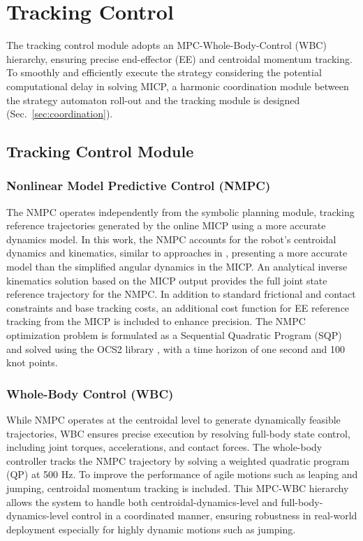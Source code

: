 \section{Tracking Control}\label{sec:tracking_control}
The tracking control module adopts an MPC-Whole-Body-Control (WBC) hierarchy, ensuring precise end-effector (EE) and centroidal momentum tracking. To smoothly and efficiently execute the strategy considering the potential computational delay in solving MICP, a harmonic coordination module between the strategy automaton roll-out and the tracking module is designed (Sec.~\ref{sec:coordination}).

\subsection{Tracking Control Module}
\subsubsection{Nonlinear Model Predictive Control (NMPC)}\label{subsec:nmpc}
The NMPC  operates independently from the symbolic planning module, tracking reference trajectories generated by the online MICP using a more accurate dynamics model. In this work, the NMPC accounts for the robot's centroidal dynamics and kinematics, similar to approaches in \citep{dai2014whole,chignoli2021humanoid,sleiman2021unified}, presenting a more accurate model than the simplified angular dynamics in the MICP. An analytical inverse kinematics solution based on the MICP output provides the full joint state reference trajectory for the NMPC.
In addition to standard frictional and contact constraints and base tracking costs, an additional cost function for EE reference tracking from the MICP is included to enhance precision. The NMPC optimization problem is formulated as a Sequential Quadratic Program (SQP) and solved using the OCS2 library \citep{OCS2}, with a time horizon of one second and 100 knot points.

\subsubsection{Whole-Body Control (WBC)}
While NMPC operates at the centroidal level to generate dynamically feasible trajectories, WBC ensures precise execution by resolving full-body state control, including joint torques, accelerations, and contact forces.
The whole-body controller tracks the NMPC trajectory by solving a weighted quadratic program (QP) \citep{kuindersma2014efficiently} at 500 Hz. To improve the performance of agile motions such as leaping and jumping, centroidal momentum tracking \citep{wensing2013generation} is included. This MPC-WBC hierarchy allows the system to handle both centroidal-dynamics-level and full-body-dynamics-level control in a coordinated manner, ensuring robustness in real-world deployment especially for highly dynamic motions such as jumping.

